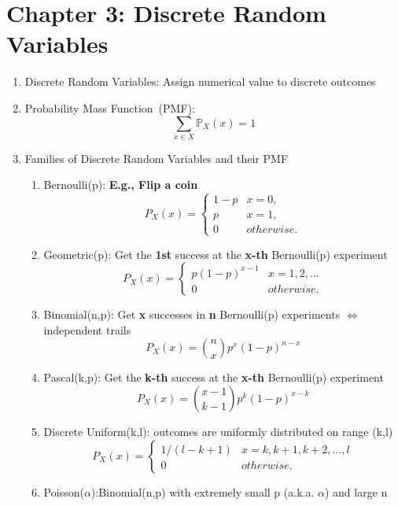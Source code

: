 \section*{Chapter 3: Discrete Random Variables}
\begin{enumerate}
    \item Discrete Random Variables: Assign numerical value to discrete outcomes
    \item Probability Mass Function~(PMF): $$\sum_{x\in X}\mathbb{P}_X(x)=1$$ 
    \item Families of Discrete Random Variables and their PMF{
        \begin{enumerate}
            \item Bernoulli(p): \textbf{E.g., Flip a coin}{
                \[ P_X(x) = 
                \begin{cases}
                    1-p & x=0, \\
                    p   & x=1, \\
                    0   & otherwise.
                \end{cases} \]
            }
            \item Geometric(p): Get the \textbf{1st} success at the \textbf{x-th} Bernoulli(p) experiment {
                \[ P_X(x) = 
                \begin{cases}
                    p(1-p)^{x-1} & x=1,2,\ldots \\
                    0   & otherwise.
                \end{cases} \]
            }
            \item Binomial(n,p): Get \textbf{x} successes in \textbf{n} Bernoulli(p) experiments $\iff$ independent trails{
                $$P_X(x) = \binom{n}{x}p^x(1-p)^{n-x}$$
            }
            \item Pascal(k,p): Get the \textbf{k-th} success at the \textbf{x-th} Bernoulli(p) experiment {
                $$P_X(x) = \binom{x-1}{k-1}p^k(1-p)^{x-k}$$
            }
            \item Discrete Uniform(k,l): outcomes are uniformly distributed on range (k,l) {
                \[ P_X(x) = 
                \begin{cases}
                    1/(l-k+1)   & x=k,k+1,k+2,\ldots,l \\
                    0   & otherwise.
                \end{cases} \]
            }
            \item Poisson($\alpha$):Binomial(n,p) with extremely small p (a.k.a. $\alpha$) and large n{
}
\end{enumerate}}
\end{enumerate}
